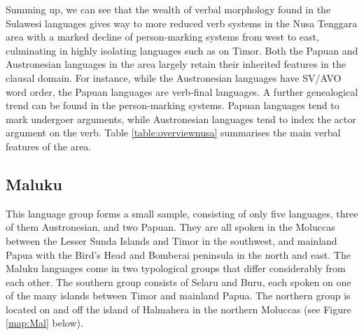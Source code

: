 Summing up, we can see that the wealth of verbal morphology found in the Sulawesi languages gives way to more reduced verb systems in the Nusa Tenggara area with a marked decline of person-marking systems from west to east, culminating in highly isolating languages such as  on Timor. Both the Papuan and Austronesian languages in the area largely retain their inherited features in the clausal domain. For instance, while the Austronesian languages have SV/AVO word order, the Papuan languages are verb-final languages. A further genealogical trend can be found in the person-marking systems. Papuan languages tend to mark undergoer arguments, while Austronesian languages tend to index the actor argument on the verb. Table \ref{table:overviewnusa} summarises the main verbal features of the area.

\begin{table}[h]
\caption[Basic verbal features of Nusa Tenggara languages]{Overview of basic verbal features of the Nusa Tenggara languages in the EI data set. Constituent order lists only the basic pattern, pragmatically induced alternative patterns are often also possible. Brackets around person marking formulae indicate that the system does not apply to all verbs in all contexts. Grouping of languages is roughly according to the discussion in the prose.}
\label{table:overviewnusa}
\end{table}

\subsection{Maluku} \label{sec:maluku}

This language group forms a small sample, consisting of only five languages, three of them Austronesian, and two Papuan. They are all spoken in the Moluccas between the Lesser Sunda Islands and Timor in the southwest, and mainland Papua with the Bird's Head and Bomberai peninsula in the north and east. The Maluku languages come in two typological groups that differ considerably from each other. The southern group consists of Selaru and Buru, each spoken on one of the many islands between Timor and mainland Papua. The northern group is located on and off the island of Halmahera in the northern Moluccas (see Figure \ref{map:Mal} below).

